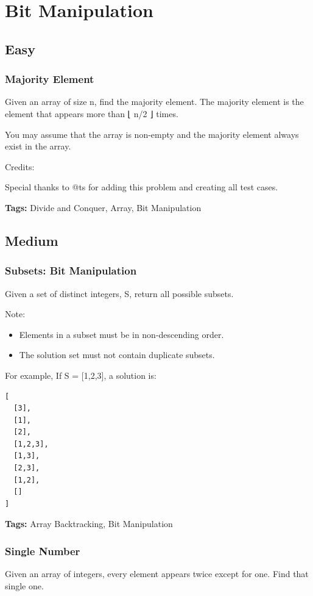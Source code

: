 \documentclass[12pt]{book}
\begin{document}
\chapter{Bit Manipulation}
\label{sec-17}
\section{Easy}
\label{sec-17-1}
\subsection{Majority Element}
\label{sec-17-1-1}
Given an array of size n, find the majority element. The majority element is the element that appears more than ⌊ n/2 ⌋ times.

You may assume that the array is non-empty and the majority element always exist in the array.

Credits:

Special thanks to @ts for adding this problem and creating all test cases.

\textbf{Tags:} Divide and Conquer, Array, Bit Manipulation

\section{Medium}
\label{sec-17-2}
\subsection{Subsets: Bit Manipulation}
\label{sec-17-2-1}
Given a set of distinct integers, S, return all possible subsets.

Note:
\begin{itemize}
\item Elements in a subset must be in non-descending order.
\item The solution set must not contain duplicate subsets.
\end{itemize}
For example,
If S = [1,2,3], a solution is:
\lstset{language=java,label= ,caption= ,numbers=none}
\begin{lstlisting}
[
  [3],
  [1],
  [2],
  [1,2,3],
  [1,3],
  [2,3],
  [1,2],
  []
]
\end{lstlisting}
\textbf{Tags:} Array Backtracking, Bit Manipulation
\subsection{Single Number}
\label{sec-17-2-2}
Given an array of integers, every element appears twice except for one. Find that single one.
\end{document}
